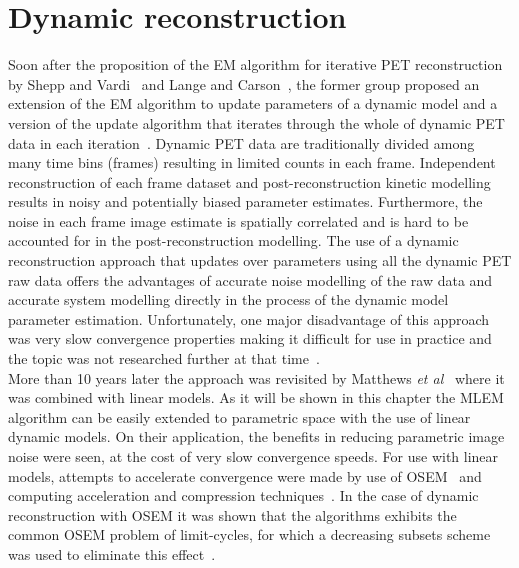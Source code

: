 \section{Dynamic reconstruction}
\label{section:Fully_4D_reconstruction}
Soon after the proposition of the EM algorithm for iterative PET reconstruction by Shepp and Vardi~\cite{Vardi1985} and Lange and Carson~\cite{Lange1984}, the former group proposed an extension of the EM algorithm to update parameters of a dynamic model and a version of the update algorithm that iterates through the whole of dynamic PET data in each iteration~\cite{Carson1985}. Dynamic PET data are traditionally divided among many time bins (frames) resulting in limited counts in each frame. Independent reconstruction of each frame dataset and post-reconstruction kinetic modelling results in noisy and potentially biased parameter estimates. Furthermore, the noise in each frame image estimate is spatially correlated and is hard to be accounted for in the post-reconstruction modelling. The use of a dynamic reconstruction approach that updates over parameters using all the dynamic PET raw data offers the advantages of accurate noise modelling of the raw data and accurate system modelling directly in the process of the dynamic model parameter estimation. Unfortunately, one major disadvantage of this approach was very slow convergence properties making it difficult for use in practice and the topic was not researched further at that time~\cite{Carson1985}. \\
More than 10 years later the approach was revisited by Matthews \textit{et al}~\cite{Matthews1995} where it was combined with linear models. As it will be shown in this chapter the MLEM algorithm can be easily extended to parametric space with the use of linear dynamic models. On their application, the benefits in reducing parametric image noise were seen, at the cost of very slow convergence speeds. For use with linear models, attempts to accelerate convergence were made by use of OSEM~\cite{Tsoumpas2008} and computing acceleration and compression techniques~\cite{Hong2008}. In the case of dynamic reconstruction with OSEM it was shown that the algorithms exhibits the common OSEM problem of limit-cycles, for which a decreasing subsets scheme was used to eliminate this effect~\cite{Angelis2011}. \\
